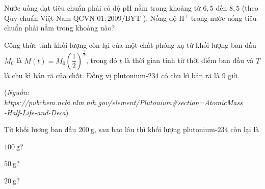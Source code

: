 \begin{bt}%
	Nước uống đạt tiêu chuẩn phải có độ $\mathrm{pH}$ nằm trong khoảng từ $6{,}5$ đến $8{,}5$ (theo Quy chuẩn Việt Nam QCVN $01: 2009 / \mathrm{BYT}$ ). Nồng độ $\mathrm{H}^{+}$ trong nước uống tiêu chuẩn phải nằm trong khoảng nào?
\end{bt}

\begin{bt}%
	Công thức tính khối lượng còn lại của một chất phóng xạ từ khối lượng ban đầu $M_0$ là $M(t)=M_0\left(\dfrac{1}{2}\right)^{\tfrac{1}{T}}$, trong đó $t$ là thời gian tính từ thời điểm ban đầu và $T$ là chu kì bán rã của chất. Đồng vị plutonium-$234$ có chu kì bán rã là $9$ giờ.
	\begin{flushright}
		(\textit{Nguồn: https://pubchem.ncbi.nlm.nih.gov/element/Plutonium\#section=AtomicMass\\-Half-Life-and-Deca})
	\end{flushright}
	Từ khối lượng ban đầu $200 \mathrm{~g}$, sau bao lâu thì khối lượng plutonium-$234$ còn lại là
	\begin{listEX}[3]
		\item $100 \mathrm{~g}$?
		\item $50 \mathrm{~g}$?
		\item $20 \mathrm{~g}$?
	\end{listEX}
\end{bt}

